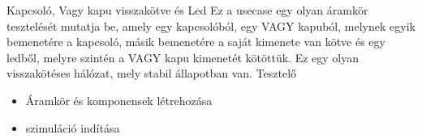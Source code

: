 \usecase
{Kapcsoló, Vagy kapu visszakötve és Led}
{Ez a usecase egy olyan áramkör tesztelését mutatja be, amely egy kapcsolóból, egy VAGY kapuból, melynek egyik bemenetére a kapcsoló, másik bemenetére a saját kimenete van kötve és egy ledből, melyre szintén a VAGY kapu kimenetét kötöttük. Ez egy olyan visszakötéses hálózat, mely stabil állapotban van.}
{Tesztelő}
{\vspace{-15pt}
\begin{itemize}
\setlength{\itemsep}{0cm}%
\setlength{\parskip}{0cm}%
\item Áramkör és komponensek létrehozása
\item szimuláció indítása

\end{itemize}}
